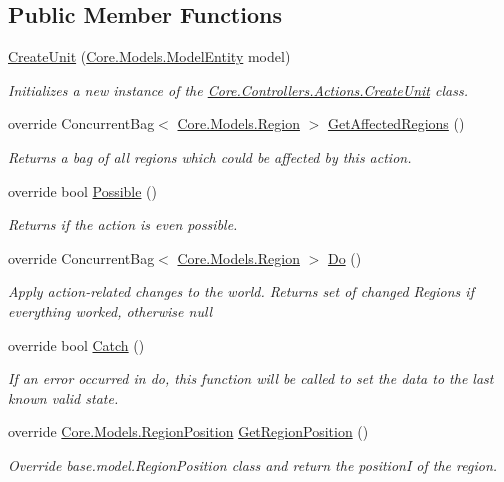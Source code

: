 \subsection*{Public Member Functions}
\begin{DoxyCompactItemize}
\item 
\hyperlink{classCore_1_1Controllers_1_1Actions_1_1CreateUnit_a38e1f619d2ec42c361d1ab532b04b2cb}{Create\+Unit} (\hyperlink{classCore_1_1Models_1_1ModelEntity}{Core.\+Models.\+Model\+Entity} model)
\begin{DoxyCompactList}\small\item\em Initializes a new instance of the \hyperlink{classCore_1_1Controllers_1_1Actions_1_1CreateUnit}{Core.\+Controllers.\+Actions.\+Create\+Unit} class. \end{DoxyCompactList}\item 
override Concurrent\+Bag$<$ \hyperlink{classCore_1_1Models_1_1Region}{Core.\+Models.\+Region} $>$ \hyperlink{classCore_1_1Controllers_1_1Actions_1_1CreateUnit_a740be9051fcd4f9a8e22d702da400ba7}{Get\+Affected\+Regions} ()
\begin{DoxyCompactList}\small\item\em Returns a bag of all regions which could be affected by this action. \end{DoxyCompactList}\item 
override bool \hyperlink{classCore_1_1Controllers_1_1Actions_1_1CreateUnit_a30ceafb2aa0fb1b801a8abd659c9d70f}{Possible} ()
\begin{DoxyCompactList}\small\item\em Returns if the action is even possible. \end{DoxyCompactList}\item 
override Concurrent\+Bag$<$ \hyperlink{classCore_1_1Models_1_1Region}{Core.\+Models.\+Region} $>$ \hyperlink{classCore_1_1Controllers_1_1Actions_1_1CreateUnit_a0afdf65e7e04f108bb257eae3327eac0}{Do} ()
\begin{DoxyCompactList}\small\item\em Apply action-\/related changes to the world. Returns set of changed Regions if everything worked, otherwise null \end{DoxyCompactList}\item 
override bool \hyperlink{classCore_1_1Controllers_1_1Actions_1_1CreateUnit_ac2763a79e6767ac7c5179281cb4e0a6f}{Catch} ()
\begin{DoxyCompactList}\small\item\em If an error occurred in do, this function will be called to set the data to the last known valid state. \end{DoxyCompactList}\item 
override \hyperlink{classCore_1_1Models_1_1RegionPosition}{Core.\+Models.\+Region\+Position} \hyperlink{classCore_1_1Controllers_1_1Actions_1_1CreateUnit_a04a85d0db9c84ca3f0e97049cca4f9c0}{Get\+Region\+Position} ()
\begin{DoxyCompactList}\small\item\em Override base.\+model.\+Region\+Position class and return the position\+I of the region. \end{DoxyCompactList}\end{DoxyCompactItemize}
